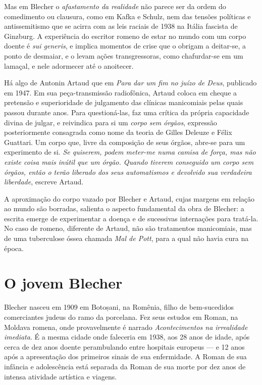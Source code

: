 Mas em Blecher o \textit{afastamento da realidade} não parece ser da ordem do comedimento ou clausura, como em Kafka e Schulz, nem das tensões políticas e  antissemitismo que se acirra com as leis raciais de 1938 na Itália fascista de Ginzburg. A experiência do escritor romeno de estar no mundo com um corpo doente é \textit{sui generis}, e implica momentos de crise que o obrigam a deitar-se, a ponto de desmaiar, e o levam ações transgressoras, como chafurdar-se em um lamaçal, e nele adormecer até o anoitecer.

Há algo de Antonin Artaud que em \textit{Para dar um fim no juízo de Deus}, publicado em 1947. Em sua peça-transmissão radiofônica, Artaud coloca em cheque a pretensão e superioridade de julgamento das clínicas manicomiais pelas quais passou durante anos. Para questioná-las, faz uma crítica da própria capacidade divina de julgar, e reivindica para si um \textit{corpo sem órgãos}, expressão posteriormente consagrada como nome da teoria de Gilles Deleuze e Félix Guattari. Um corpo que, livre da composição de seus órgãos, abre-se para um experimento de si. \textit{Se quiserem, podem meter-me numa camisa de força, mas não existe coisa mais inútil que um órgão. Quando tiverem conseguido um corpo sem órgãos, então o terão liberado dos seus automatismos e devolvido sua verdadeira liberdade}, escreve Artaud.

A aproximação do corpo vazado por Blecher e Artaud, cujas margens em relação ao mundo são borradas, salienta o aspecto fundamental da obra de Blecher: a escrita emerge de experimentar a doença e de sucessivas internações para tratá-la. No caso de romeno, diferente de Artaud, não são tratamentos manicomiais, mas de uma tuberculose óssea chamada \textit{Mal de Pott}, para a qual não havia cura na época.

\section{O jovem Blecher}

Blecher nasceu em 1909 em Botoșani, na Romênia, filho de bem-sucedidos comerciantes judeus do ramo da porcelana. Fez seus estudos em Roman, na Moldava romena, onde provavelmente é narrado \textit{Acontecimentos na irrealidade imediata}. É a mesma cidade onde faleceria em 1938, aos 28 anos de idade, após cerca de dez anos doente perambulando entre hospitais europeus --- e 12 anos após a apresentação dos primeiros sinais de sua enfermidade. A Roman de sua infância e adolescência está separada da Roman de sua morte por dez anos de intensa atividade artística e viagens.

